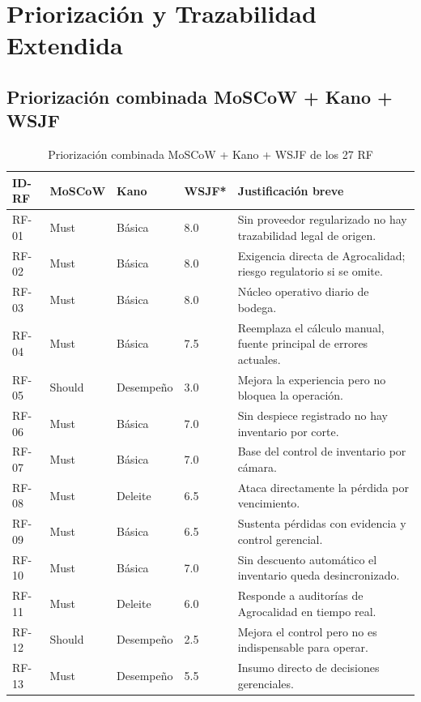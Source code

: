 \documentclass[11pt,a4paper]{article}
\begin{document}
\section{Priorización y Trazabilidad Extendida}

\subsection{Priorización combinada MoSCoW + Kano + WSJF}

\begin{longtable}{|p{1.3cm}|p{1.8cm}|p{2.2cm}|p{1.6cm}|p{7.5cm}|}
\caption{Priorización combinada MoSCoW + Kano + WSJF de los 27 RF}\\
\hline
\textbf{ID-RF} & \textbf{MoSCoW} & \textbf{Kano} & \textbf{WSJF*} & \textbf{Justificación breve} \\
\hline
RF-01 & Must & Básica & 8.0 & Sin proveedor regularizado no hay trazabilidad legal de origen. \\
RF-02 & Must & Básica & 8.0 & Exigencia directa de Agrocalidad; riesgo regulatorio si se omite. \\
RF-03 & Must & Básica & 8.0 & Núcleo operativo diario de bodega. \\
RF-04 & Must & Básica & 7.5 & Reemplaza el cálculo manual, fuente principal de errores actuales. \\
RF-05 & Should & Desempeño & 3.0 & Mejora la experiencia pero no bloquea la operación. \\
RF-06 & Must & Básica & 7.0 & Sin despiece registrado no hay inventario por corte. \\
RF-07 & Must & Básica & 7.0 & Base del control de inventario por cámara. \\
RF-08 & Must & Deleite & 6.5 & Ataca directamente la pérdida por vencimiento. \\
RF-09 & Must & Básica & 6.5 & Sustenta pérdidas con evidencia y control gerencial. \\
RF-10 & Must & Básica & 7.0 & Sin descuento automático el inventario queda desincronizado. \\
RF-11 & Must & Deleite & 6.0 & Responde a auditorías de Agrocalidad en tiempo real. \\
RF-12 & Should & Desempeño & 2.5 & Mejora el control pero no es indispensable para operar. \\
RF-13 & Must & Desempeño & 5.5 & Insumo directo de decisiones gerenciales. \\

\end{longtable}
\end{document}
